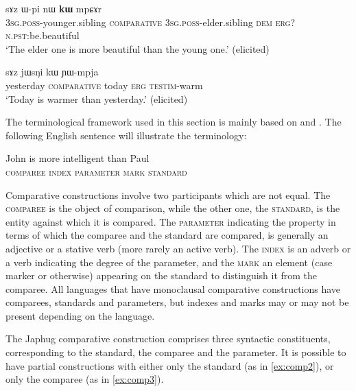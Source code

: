 \documentclass[oldfontcommands,oneside,a4paper,11pt]{article}
\newcommand{\ipa}[1]{{\phon #1}} %
\begin{document}
\begin{exe}
\ex \label{ex:comp1}
\gll  \ipa{ɯ-ʁi}   	\ipa{sɤz}   	\ipa{ɯ-pi}   	\ipa{nɯ}   	\ipa{\textbf{kɯ}}   	\ipa{mpɕɤr}     \\
\textsc{3sg.poss}-younger.sibling \textsc{comparative} \textsc{3sg.poss}-elder.sibling \textsc{dem} \textsc{erg?}  \textsc{n.pst:}be.beautiful \\
\glt `The elder one is more beautiful than the young one.' (elicited)
\end{exe}
 
 
\begin{exe}
\ex \label{ex:comparative.complete}
\gll \ipa{jɯfɕɯr}   	\ipa{sɤz }   	\ipa{jɯsŋi}   	\ipa{kɯ}   	\ipa{ɲɯ-mpja}   \\
yesterday \textsc{comparative} today \textsc{erg} \textsc{testim}-warm \\
\glt `Today is warmer than yesterday.' (elicited)
\end{exe}

The terminological framework used in this section is mainly based on \citet{dixon08comparative} and \citet{stassen11comparative}. The following English sentence will illustrate the  terminology:

\begin{exe}
\ex \label{ex:comp.eng}
\gll  John is more intelligent than Paul \\
\textsc{comparee} { } \textsc{index} \textsc{parameter} \textsc{mark} \textsc{standard}  \\
\end{exe}

Comparative constructions involve two participants which are not equal. The \textsc{comparee} is  the object of comparison, while the other one, the \textsc{standard}, is the entity against which it is compared. The \textsc{parameter} indicating the property in terms of which the comparee and the standard are compared, is generally an adjective or a stative verb (more rarely an active verb). The \textsc{index} is an adverb or a verb indicating the degree of the parameter, and the \textsc{mark} an element (case marker or otherwise) appearing on the standard to distinguish it from the comparee. All languages that have monoclausal comparative constructions have comparees, standards and parameters, but indexes and marks may or may not be present depending on the language.

 

The Japhug comparative construction comprises three syntactic constituents, corresponding to the standard, the comparee and the parameter. It is possible to have partial constructions with either only the standard (as in \ref{ex:comp2}), or only the comparee (as in \ref{ex:comp3}).
\end{document}
